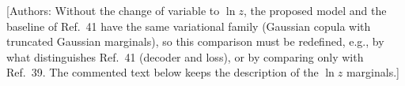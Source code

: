 \documentclass[11pt]{article}
\newcommand{\authornote}[1]{\textcolor{note}{\textsf{[Authors: #1]}}}
\newcommand{\m}{\mathbf{m}}
\newcommand{\z}{\mathbf{z}}
\begin{document}
\authornote{Without the change of variable to $\ln z$, the proposed model and the baseline of Ref.~41 have the same variational family (Gaussian copula with truncated Gaussian marginals), so this comparison must be redefined, e.g., by what distinguishes Ref.~41 (decoder and loss), or by comparing only with Ref.~39. The commented text below keeps the description of the $\ln z$ marginals.}
%
\end{document}
